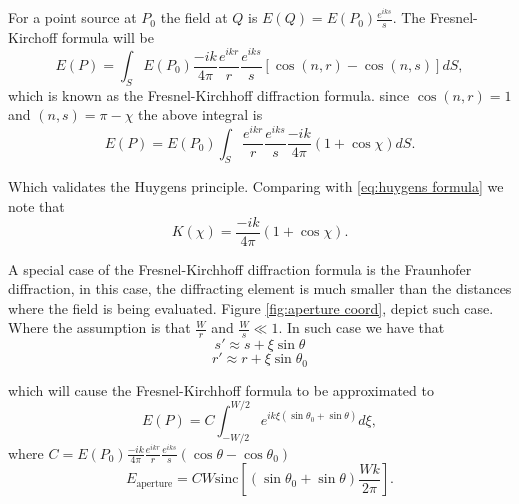 \documentclass[12pt,twoside,english]{book}
\renewcommand{\~}{\perispomeni}%
\numberwithin{equation}{section}
\numberwithin{figure}{section}
\begin{document}
For a point source at $P_{0}$ the field at $Q$ is $E\left(Q\right)=E\left(P_{0}\right)\frac{e^{iks}}{s}$.
The Fresnel-Kirchoff formula will be
\begin{equation}
E\left(P\right)=\int_{S}E\left(P_{0}\right)\frac{-ik}{4\pi}\frac{e^{ikr}}{r}\frac{e^{iks}}{s}\left[\cos\left(n,r\right)-\cos\left(n,s\right)\right]dS,
\label{eq:Fresnel-Kirchhoff}
\end{equation}
which is known as the Fresnel-Kirchhoff diffraction formula. since $\cos\left(n,r\right)=1$ and $\left(n,s\right)=\pi-\chi$ the above integral is
\begin{equation}
E\left(P\right)=E\left(P_{0}\right)\int_{S}\frac{e^{ikr}}{r}\frac{e^{iks}}{s}\frac{-ik}{4\pi}\left(1+\cos\chi\right)dS.
\end{equation}

Which validates the Huygens principle. Comparing with \ref{eq:huygens formula} we note that
\begin{equation}
K\left(\chi\right)=\frac{-ik}{4\pi}\left(1+\cos\chi\right).
\end{equation}


A special case of the Fresnel-Kirchhoff diffraction formula is the Fraunhofer diffraction, in this case, the diffracting element is much smaller than the distances where the field is being evaluated. Figure \ref{fig:aperture coord}, depict such case. Where the assumption is that $\frac{W}{r}$ and $\frac{W}{s}\ll1$. In such case we have that
\begin{equation}
s'\approx s+\xi\sin\theta
\end{equation}
\begin{equation}
r'\approx r+\xi\sin\theta_{0}
\end{equation}


which will cause the Fresnel-Kirchhoff formula to be approximated to
\begin{equation}
E\left(P\right)=C\int_{-W/2}^{W/2}e^{ik\xi\left(\sin\theta_{0}+\sin\theta\right)}d\xi,
\label{eq:Fraunhofer}
\end{equation}
where $C=E\left(P_{0}\right)\frac{-ik}{4\pi}\frac{e^{ikr}}{r}\frac{e^{iks}}{s}\left(\cos\theta-\cos\theta_{0}\right)$
\begin{equation}
E_{\text{aperture}}=CW\text{sinc}\left[\left(\sin\theta_{0}+\sin\theta\right)\frac{Wk}{2\pi}\right].
\end{equation}
\end{document}
